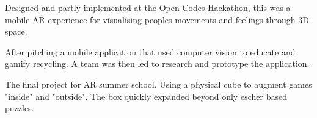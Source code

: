 \documentclass[a4paper]{deedy-resume} %
\begin{document}
\begin{minipage}[t]{0.66\textwidth}

Designed and partly implemented at the Open Codes Hackathon, this was a mobile AR experience for visualising peoples movements and feelings through 3D space.

\sectionspace %



After pitching a mobile application that used computer vision to educate and gamify recycling. %
A team was then led to research and prototype the application. %

\sectionspace %



The final project for AR summer school. Using a physical cube to augment games "inside" and "outside". The box quickly expanded beyond only escher based puzzles.%
\sectionspace %


\end{minipage}
\end{document}

